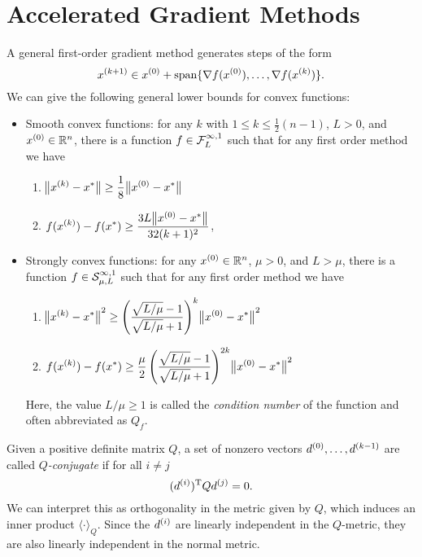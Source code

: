 \documentclass{article}
\begin{document}
\section{Accelerated Gradient Methods}

\label{s:convex-lower-bound}

A general first-order gradient method generates steps of the form
\begin{equation*}
  \kth[k+1]{x} \in \kth[0]{x} + \Span \{\nabla f(\kth[0]{x}), \ldots, \nabla f(\kth{x})\}.
\end{equation*}
We can give the following general lower bounds for convex functions:
\begin{itemize}
\item Smooth convex functions: for any \(k\) with \(1 \leq k \leq \frac{1}{2}(n - 1)\), \(L > 0\),
  and \(\kth[0]{x} \in \RR^n\), there is a function \(f \in \Lip{L}{\infty}{1}\) such that for any
  first order method we have
  \begin{enumerate}
  \item \(\displaystyle \enVert[1]{\kth{x} - x^*} \geq \frac{1}{8} \enVert[1]{\kth[0]{x} - x^*}\)
  \item \(\displaystyle f(\kth{x}) - f(x^*) \geq \frac{3L \enVert[1]{\kth[0]{x} - x^*}}{32 (k+1)^2}\),
  \end{enumerate}
\item Strongly convex functions: for any \(\kth[0]{x} \in \RR^n\), \(\mu > 0\), and \(L > \mu\),
  there is a function \(f \in \Strong{\mu}{L}{\infty}{1}\) such that for any first order method we
  have
  \begin{enumerate}
  \item \(\displaystyle \enVert[1]{\kth{x} - x^*}^2 \geq
    \left( \frac{\sqrt{L/\mu} - 1}{\sqrt{L/\mu} + 1} \right)^k \enVert[1]{\kth[0]{x} - x^*}^2\)
  \item \(\displaystyle \displaystyle f(\kth{x}) - f(x^*) \geq \frac{\mu}{2}
    \left( \frac{\sqrt{L/\mu} - 1}{\sqrt{L/\mu} + 1} \right)^{2k} \enVert[1]{\kth[0]{x} - x^*}^2\)
  \end{enumerate}
  Here, the value \(L / \mu \geq 1\) is called the \emph{condition number} of the function and often
  abbreviated as \(Q_f\).
\end{itemize}


\label{s:q-conjugacy}

Given a positive definite matrix \(Q\), a set of nonzero vectors
\(\kth[0]{d}, \ldots, \kth[k-1]{d}\) are called \emph{\(Q\)-conjugate} if for all \(i \neq j\)
\begin{equation*}
  \T{(\kth[i]{d})} Q \kth[j]{d} = 0.
\end{equation*}
We can interpret this as orthogonality in the metric given by \(Q\), which induces an inner product
\(\langle \cdot \rangle_Q\).  Since the \(\kth[i]{d}\) are linearly independent in the \(Q\)-metric,
they are also linearly independent in the normal metric.
\end{document}
